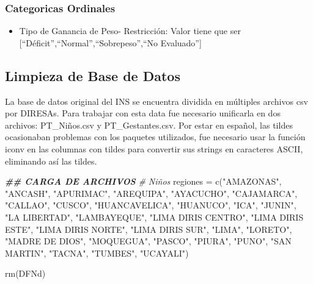 \documentclass[
]{article}
\newenvironment{Shaded}{\begin{snugshade}}{\end{snugshade}}
\newcommand{\CommentTok}[1]{\textcolor[rgb]{0.56,0.35,0.01}{\textit{#1}}}
\newcommand{\DocumentationTok}[1]{\textcolor[rgb]{0.56,0.35,0.01}{\textbf{\textit{#1}}}}
\newcommand{\FunctionTok}[1]{\textcolor[rgb]{0.00,0.00,0.00}{#1}}
\newcommand{\NormalTok}[1]{#1}
\newcommand{\OtherTok}[1]{\textcolor[rgb]{0.56,0.35,0.01}{#1}}
\newcommand{\StringTok}[1]{\textcolor[rgb]{0.31,0.60,0.02}{#1}}
\providecommand{\tightlist}{%
  \setlength{\itemsep}{0pt}\setlength{\parskip}{0pt}}
\begin{document}
\hypertarget{categoricas-ordinales-1}{%
\subsubsection{Categoricas Ordinales}\label{categoricas-ordinales-1}}

\begin{itemize}
\tightlist
\item
  Tipo de Ganancia de Peso- Restricción: Valor tiene que ser
  {[}``Déficit'',``Normal'',``Sobrepeso'',``No Evaluado''{]}
\end{itemize}

\hypertarget{limpieza-de-base-de-datos}{%
\subsection{Limpieza de Base de Datos}\label{limpieza-de-base-de-datos}}

La base de datos original del INS se encuentra dividida en múltiples
archivos csv por DIRESAs. Para trabajar con esta data fue necesario
unificarla en dos archivos: PT\_Niños.csv y PT\_Gestantes.csv. Por estar
en español, las tildes ocasionaban problemas con los paquetes
utilizados, fue necesario usar la función iconv en las columnas con
tildes para convertir sus strings en caracteres ASCII, eliminando así
las tildes.

\begin{Shaded}
\begin{Highlighting}[]
\DocumentationTok{\#\# CARGA DE ARCHIVOS}
\CommentTok{\# Niños}
\NormalTok{regiones }\OtherTok{=} \FunctionTok{c}\NormalTok{(}\StringTok{"AMAZONAS"}\NormalTok{, }\StringTok{"ANCASH"}\NormalTok{, }\StringTok{"APURIMAC"}\NormalTok{, }\StringTok{"AREQUIPA"}\NormalTok{, }\StringTok{"AYACUCHO"}\NormalTok{, }\StringTok{"CAJAMARCA"}\NormalTok{, }\StringTok{"CALLAO"}\NormalTok{, }\StringTok{"CUSCO"}\NormalTok{, }\StringTok{"HUANCAVELICA"}\NormalTok{, }\StringTok{"HUANUCO"}\NormalTok{, }\StringTok{"ICA"}\NormalTok{, }\StringTok{"JUNIN"}\NormalTok{, }\StringTok{"LA LIBERTAD"}\NormalTok{, }\StringTok{"LAMBAYEQUE"}\NormalTok{, }\StringTok{"LIMA DIRIS CENTRO"}\NormalTok{, }\StringTok{"LIMA DIRIS ESTE"}\NormalTok{, }\StringTok{"LIMA DIRIS NORTE"}\NormalTok{, }\StringTok{"LIMA DIRIS SUR"}\NormalTok{, }\StringTok{"LIMA"}\NormalTok{, }\StringTok{"LORETO"}\NormalTok{, }\StringTok{"MADRE DE DIOS"}\NormalTok{, }\StringTok{"MOQUEGUA"}\NormalTok{, }\StringTok{"PASCO"}\NormalTok{, }\StringTok{"PIURA"}\NormalTok{, }\StringTok{"PUNO"}\NormalTok{, }\StringTok{"SAN MARTIN"}\NormalTok{, }\StringTok{"TACNA"}\NormalTok{, }\StringTok{"TUMBES"}\NormalTok{, }\StringTok{"UCAYALI"}\NormalTok{)}

\FunctionTok{rm}\NormalTok{(DFNd)}
\end{Highlighting}
\end{Shaded}
\end{document}

